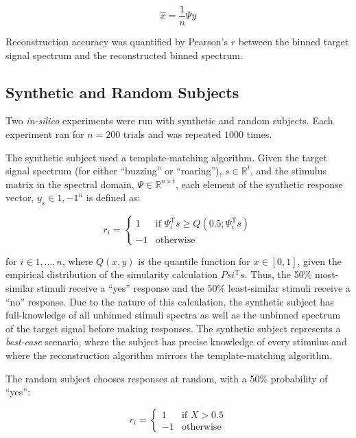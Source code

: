 \documentclass[journal]{IEEEtran}
\begin{document}
\begin{equation}
  \hat{x} = \frac{1}{n} \Psi y
  \label{eq:linreg}
\end{equation}

Reconstruction accuracy was quantified by Pearson's $r$
between the binned target signal spectrum and the reconstructed binned spectrum.

\subsection{Synthetic and Random Subjects}

Two \textit{in-silico} experiments were run with synthetic and random subjects.
Each experiment ran for $n=200$ trials and was repeated $1000$ times.

The synthetic subject used a template-matching algorithm.
Given the target signal spectrum (for either ``buzzing'' or ``roaring''), 
$s \in \mathbb{R}^t$,
and the stimulus matrix in the spectral domain, $\Psi \in \mathbb{R}^{n \times t}$,
each element of the synthetic response vector, $y_s \in {1,-1}^n$ is defined as:

\begin{equation}
    r_i =
        \begin{cases}
            1 & \text{if } \Psi_i^\mathrm{T} s \geq Q(0.5; \Psi_i^\mathrm{T} s) \\
            -1 & \text{otherwise}
        \end{cases}
\end{equation}

for $i \in 1, ..., n$, where $Q(x, y)$ is the quantile function for $x \in [0, 1]$, given the empirical distribution
of the simularity calculation $Psi^\mathrm{T} s$.
Thus, the 50\% most-similar stimuli receive a ``yes'' response and the 50\% least-similar stimuli
receive a ``no'' response.
Due to the nature of this calculation, the synthetic subject has full-knowledge of all
unbinned stimuli spectra as well as the unbinned spectrum of the target signal before making responses.
The synthetic subject represents a \textit{best-case} scenario,
where the subject has precise knowledge of every stimulus and where the reconstruction algorithm
mirrors the template-matching algorithm.

The random subject chooses responses at random, with a 50\% probability of ``yes'':

\begin{equation}
    r_i =
    \begin{cases}
        1 & \text{if  } X > 0.5 \\
        -1 & \text{otherwise}
    \end{cases}
\end{equation}
\end{document}
